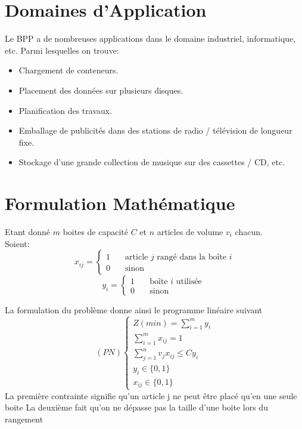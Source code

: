 \documentclass[12pt]{article}
\begin{document}
    \section{Domaines d'Application}
Le BPP a de nombreuses applications dans le domaine industriel, informatique, etc. Parmi lesquelles on trouve:
    \renewcommand{\labelitemi}{$\circ$}  
    \begin{itemize}
        \item Chargement de conteneurs.
        \item Placement des données sur plusieurs disques.
        \item Planification des travaux.
        \item Emballage de publicités dans des stations de radio / télévision de longueur fixe.
        \item Stockage d’une grande collection de musique sur des cassettes / CD, etc.
    \end{itemize}
    \section{Formulation Mathématique}
    Etant donné \(m\) boites de capacité \(C\) et \(n\) articles de volume \(v_i\) chacun. \\
    Soient: 
    \[ x_{ij} =
        \begin{cases}
            1  & \quad \text{article } j \text{ rangé dans la boîte } i \\
            0  & \quad \text{sinon } 
        \end{cases}
    \]
\[ y_i =
    \begin{cases}
        1  & \quad \text{boîte } i \text{ utilisée } \\
        0  & \quad \text{sinon } 
    \end{cases}
\]

La formulation du problème donne ainsi le programme linéaire suivant
\[(PN)
    \begin{cases}
        Z(min) = \displaystyle\sum_{i=1}^{m} y_i \\
        \displaystyle\sum_{i=1}^{m} x_{ij}  = 1 \\
        \displaystyle\sum_{j=1}^{n} v_j x_{ij} \le C y_i \\
        y_i \in \{0,1\} \\
        x_{ij} \in \{0,1\} 
    \end{cases}
\]  
La première contrainte signifie qu’un article j ne peut être placé qu’en une seule boite
La deuxième fait qu’on ne dépasse pas la taille d’une boite lors du rangement
\end{document}
